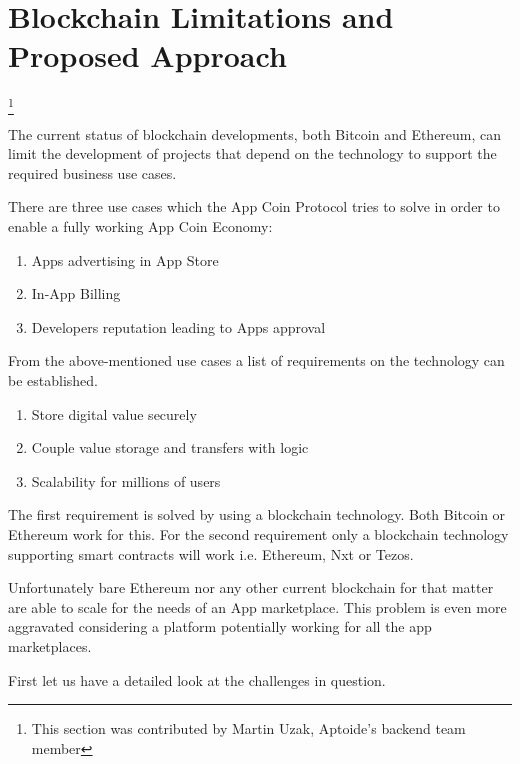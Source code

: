 \section{Blockchain Limitations and Proposed Approach}\footnote{This section was contributed by Martin Uzak, Aptoide's backend team member}

\label{sec:limitations}

The current status of blockchain developments, both Bitcoin and Ethereum, can limit the development of projects that depend on the technology to support the required business use cases. %

 
There are three use cases which the App Coin Protocol tries to solve in order to enable a fully working App Coin Economy:


\begin{enumerate}
    \item Apps advertising in App Store
    \item In-App Billing 
    \item Developers reputation leading to Apps approval
\end{enumerate}

From the above-mentioned use cases a list of requirements on the technology can be established. 

\begin{enumerate}
    \item Store digital value securely
    \item Couple value storage and transfers with logic
    \item Scalability for millions of users
\end{enumerate}

The first requirement is solved by using a blockchain technology. Both Bitcoin or Ethereum work for this. For the second requirement only a blockchain technology supporting smart contracts will work i.e. Ethereum, Nxt or Tezos.

Unfortunately bare Ethereum nor any other current blockchain for that matter are able to scale for the needs of an App marketplace. This problem is even more aggravated considering a platform potentially working for all the app marketplaces.

First let us have a detailed look at the challenges in question.

